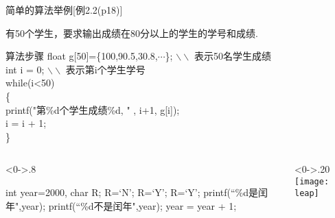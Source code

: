 \begin{frame}[shrink]{简单的算法举例[例2.2(p18)]}
\begin{example}
	[例2.2(p18)] 有50个学生，要求输出成绩在80分以上的学生的学号和成绩.
\end{example}

\begin{block}{算法步骤}
	float g[50]=\{100,90.5,30.8,$\cdots$\}; $\backslash\backslash$ 表示50名学生成绩\\
	int i = 0;  $\backslash\backslash$ 表示第i个学生学号\\
	while(i<50) \\
	\{ \\
	   \qquad printf("第\%d个学生成绩\%d, " , i+1, g[i]); \\
	   \qquad i = i + 1;\\
	\} 
\end{block}
\end{frame}

\begin{frame}[shrink]
\begin{columns}%
	\begin{column}<0->{.8\textwidth}
		\begin{algorithm}[H]  
			\caption{例2.3(p18): 判定2000—2500年中的每一年是否为闰年.} %
			\begin{algorithmic}[1] %
				\State int year=2000, char R; 
				\State R=`N';  
				 R=`Y'; %
				 R=`Y';
				\EndIf
				 printf(``\%d是闰年",year); 
				\Else \quad printf(``\%d不是闰年",year);
				\EndIf	
				\State year = year + 1;
				\EndWhile
			\end{algorithmic}  
		\end{algorithm}
	\end{column}%
	\begin{column}<0->{.20\textwidth}
		\newline
		\newline 
		\newline
		\newline 
		\newline
		\newline 
		\texttt{[image: leap]}
	\end{column}%
\end{columns}
\end{frame}

